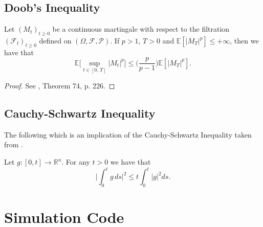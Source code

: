 \begin{appendices}
\subsection{Doob's Inequality}
\begin{theorem}
Let $(M_t)_{t \geq 0}$ be a continuous martingale with respect to the filtration $(\mathcal{F}_t)_{t \geq 0}$ defined on $(\Omega , \mathcal{F}, \mathcal{P})$. If $p > 1$, $T > 0$ and  $\mathbb{E}[|M_T|^p] \leq +\infty$, then we have that
\begin{equation}\label{Append_Doob_ineq}
    \mathbb{E}\big[\sup_{t \in [0, \, T]}|M_t|^p\big]  \leq \bigg( \dfrac{p}{p-1}\bigg)\mathbb{E}[|M_T|^p].
\end{equation}
\end{theorem}
\begin{proof}
See , Theorem 74, p. 226.
\end{proof}
\subsection{Cauchy-Schwartz Inequality}
The following which is an implication of the Cauchy-Schwartz Inequality taken from .
\begin{theorem}
Let $g : [0, t] \to \mathbb{R}^n$. For any $t > 0 $ we have that 
\begin{equation}\label{Appendix_CS}
    \bigg| \int^t_0 g \, ds  \bigg|^2 \leq t \int^t_0 |g|^2 ds.
\end{equation}
\end{theorem}


\section{Simulation Code}

\end{appendices}